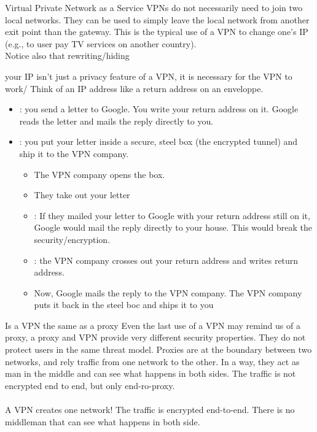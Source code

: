 \begin{parag}{Virtual Private Network as a Service}
    VPNs do not necessarily need to join two local networks. They can be used to simply leave the local network from another exit point than the gateway. This is the typical use of a VPN to change one's IP (e.g., to user pay TV services on another country).\\
	
	Notice also that rewriting/hiding 
\end{parag}


your IP isn't just a privacy feature of a VPN, it is necessary for the VPN to work/ Think of an IP address like a return address on an enveloppe.
\begin{itemize}
    \item {}: you send a letter to Google. You write your return address on it. Google reads the letter and mails the reply directly to you.
    \item {}: you put your letter inside a secure, steel box (the encrypted tunnel) and ship it to the VPN company.
		\begin{itemize}
		\item The VPN company opens the box.
		\item They take out your letter
		\item {}: If they mailed your letter to Google with your return address still on it, Google would mail the reply directly to your house. This would break the security/encryption.
		\item {}: the VPN company crosses out your return address and writes  return address.
		\item Now, Google mails the reply to the VPN company. The VPN company puts it back in the steel boc and ships it to you
		\end{itemize}
\end{itemize}



\begin{parag}{Is a VPN the same as a proxy}
    Even the last use of a VPN may remind us of a proxy, a proxy and VPN provide very different security properties. They do not protect users in the same threat model. Proxies are at the boundary between two networks, and rely traffic from one network to the other. In a way, they act as man in the middle and can see what happens in both sides. The traffic is not encrypted end to end, but only end-ro-proxy.\\
	$ $\\
 	A VPN creates one network! The traffic is encrypted end-to-end. There is no middleman that can see what happens in both side.
\end{parag}






